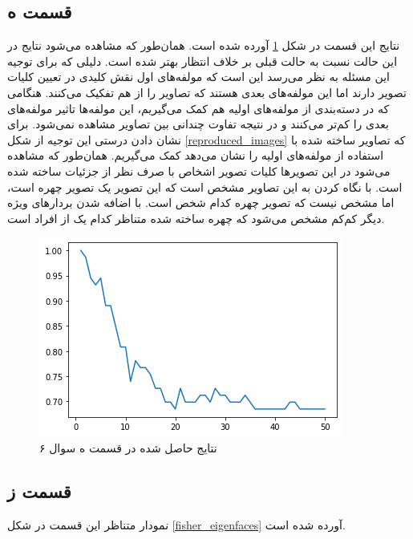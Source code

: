 \documentclass{article}
\begin{document}
\subsection*{قسمت ه}

نتایج این قسمت در شکل \ref{q6_top_removed_eigenvectors} آورده شده است. همان‌طور که مشاهده می‌شود نتایج در این حالت
نسبت به حالت قبلی بر خلاف انتظار بهتر شده است. دلیلی که برای توجیه این مسئله به نظر می‌رسد این است که مولفه‌های اول
نقش کلیدی در تعیین کلیات تصویر دارند اما این مولفه‌های بعدی هستند که تصاویر را از هم تفکیک می‌کنند. هنگامی که
در دسته‌بندی از مولفه‌های اولیه هم کمک می‌گیریم، این مولفه‌ها تاثیر مولفه‌های بعدی را کم‌تر می‌کنند و در نتیجه تفاوت
چندانی بین تصاویر مشاهده نمی‌شود. برای نشان دادن درستی
این توجیه از شکل \ref{reproduced_images} که تصاویر ساخته شده با استفاده از مولفه‌های اولیه
را نشان می‌دهد کمک می‌گیریم. همان‌طور که مشاهده می‌شود در این تصویر‌ها کلیات تصویر اشخاص با
صرف نظر از جزئیات ساخته شده است. با نگاه کردن به این تصاویر مشخص است که این تصویر یک تصویر چهره است،
اما مشخص نیست که تصویر چهره کدام شخص است. با اضافه شدن بردار‌های ویژه دیگر کم‌کم مشخص می‌شود که چهره ساخته شده
متناظر کدام یک از افراد است.

\begin{figure}[h]
    \centering
    \includegraphics[scale=0.5]{images/q6/result_parte.png}
    \caption{نتایج حاصل شده در قسمت ه سوال ۶}
    \label{q6_top_removed_eigenvectors}
\end{figure}

\subsection*{قسمت ز}

نمودار متناظر این قسمت در شکل \ref{fisher_eigenfaces} آورده شده است.
\end{document}
